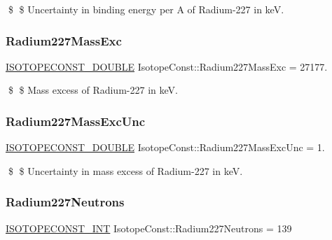 \$ \$ Uncertainty in binding energy per A of Radium-\/227 in keV. \mbox{\label{group___isotope_const-_radium-_ra227_gae6c8d85fc14262d0bebff7991c18f525}} 
\subsubsection{\texorpdfstring{Radium227\+Mass\+Exc}{Radium227MassExc}}
{\footnotesize\ttfamily \mbox{\hyperlink{group___isotope_const-_macros_ga8f45a7272ce02c0b4c65c44636ed719a}{I\+S\+O\+T\+O\+P\+E\+C\+O\+N\+S\+T\+\_\+\+D\+O\+U\+B\+LE}} Isotope\+Const\+::\+Radium227\+Mass\+Exc = 27177.}

\$ \$ Mass excess of Radium-\/227 in keV. \mbox{\label{group___isotope_const-_radium-_ra227_ga8dadcc84e297d229060a49c86b3cb8fb}} 
\subsubsection{\texorpdfstring{Radium227\+Mass\+Exc\+Unc}{Radium227MassExcUnc}}
{\footnotesize\ttfamily \mbox{\hyperlink{group___isotope_const-_macros_ga8f45a7272ce02c0b4c65c44636ed719a}{I\+S\+O\+T\+O\+P\+E\+C\+O\+N\+S\+T\+\_\+\+D\+O\+U\+B\+LE}} Isotope\+Const\+::\+Radium227\+Mass\+Exc\+Unc = 1.}

\$ \$ Uncertainty in mass excess of Radium-\/227 in keV. \mbox{\label{group___isotope_const-_radium-_ra227_ga96041ce05746e88a553f0307375ff171}} 
\subsubsection{\texorpdfstring{Radium227\+Neutrons}{Radium227Neutrons}}
{\footnotesize\ttfamily \mbox{\hyperlink{group___isotope_const-_macros_ga5f18360b3e99483a35c32d789e62621c}{I\+S\+O\+T\+O\+P\+E\+C\+O\+N\+S\+T\+\_\+\+I\+NT}} Isotope\+Const\+::\+Radium227\+Neutrons = 139}

